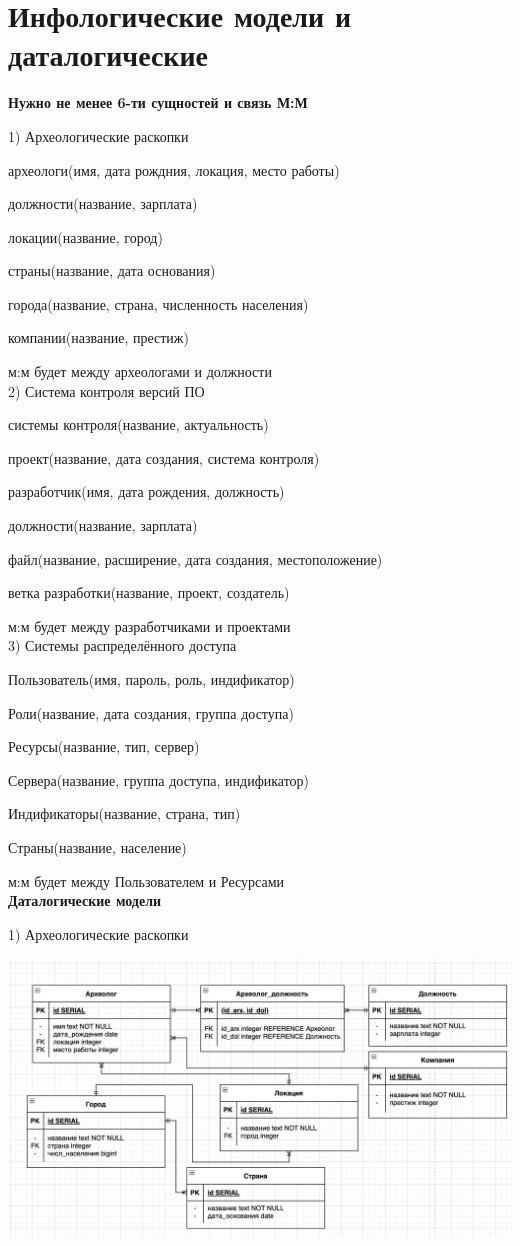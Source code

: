 \documentclass{article}
\begin{document}
\section{Инфологические модели и даталогические}
\textbf{Нужно не менее 6-ти сущностей и связь М:М}

1) Археологические раскопки

археологи(имя, дата рождния, локация, место работы)

должности(название, зарплата)

локации(название, город)

страны(название, дата основания)

города(название, страна, численность населения)

компании(название, престиж)

м:м будет между археологами и должности\\

2) Система контроля версий ПО 

системы контроля(название, актуальность)

проект(название, дата создания, система контроля)

разработчик(имя, дата рождения, должность)

должности(название, зарплата)

файл(название, расширение, дата создания, местоположение)

ветка разработки(название, проект, создатель)

м:м будет между разработчиками и проектами\\

3) Системы распределённого доступа

Пользователь(имя, пароль, роль, индификатор)

Роли(название, дата создания, группа доступа)

Ресурсы(название, тип, сервер)

Сервера(название, группа доступа, индификатор)

Индификаторы(название, страна, тип)

Страны(название, население)

м:м будет между Пользователем и Ресурсами\\

\textbf{Даталогические модели}

1) Археологические раскопки

\includegraphics[width=.9\textwidth]{123}
\end{document}
